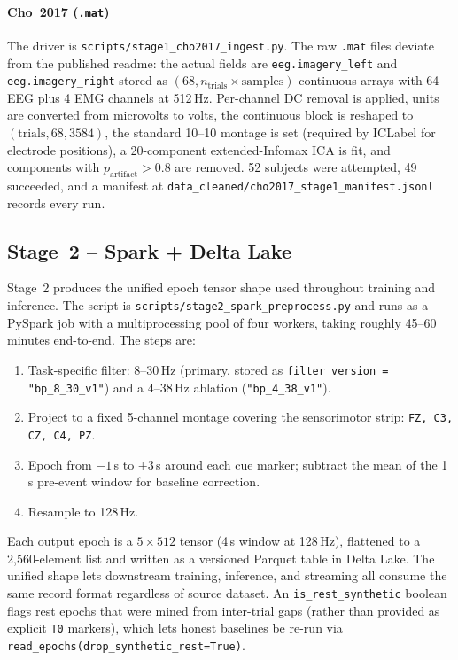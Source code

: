 \documentclass[conference]{IEEEtran}
\begin{document}
\paragraph{Cho~2017 (\texttt{.mat})} The driver is
\texttt{scripts/stage1\_cho2017\_ingest.py}. The raw \texttt{.mat} files
deviate from the published readme: the actual fields are
\texttt{eeg.imagery\_left} and \texttt{eeg.imagery\_right} stored as
$(68, n_\text{trials} \times \text{samples})$ continuous arrays with 64 EEG
plus 4 EMG channels at 512\,Hz. Per-channel DC removal is applied, units
are converted from microvolts to volts, the continuous block is reshaped to
$(\text{trials}, 68, 3584)$, the standard 10--10 montage is set (required
by ICLabel for electrode positions), a 20-component extended-Infomax ICA is
fit, and components with $p_\text{artifact} > 0.8$ are removed. 52 subjects
were attempted, 49 succeeded, and a manifest at
\texttt{data\_cleaned/cho2017\_stage1\_manifest.jsonl} records every
run.

\subsection{Stage~2 -- Spark + Delta Lake}

Stage~2 produces the unified epoch tensor shape used throughout training and
inference. The script is \texttt{scripts/stage2\_spark\_preprocess.py} and
runs as a PySpark job with a multiprocessing pool of four workers, taking
roughly 45--60 minutes end-to-end. The steps are:
\begin{enumerate}
\item Task-specific filter: 8--30\,Hz (primary, stored as
      \texttt{filter\_version = "bp\_8\_30\_v1"}) and a 4--38\,Hz ablation
      (\texttt{"bp\_4\_38\_v1"}).
\item Project to a fixed 5-channel montage covering the sensorimotor strip:
      \texttt{FZ, C3, CZ, C4, PZ}.
\item Epoch from $-1$\,s to $+3$\,s around each cue marker; subtract the
      mean of the 1\,s pre-event window for baseline correction.
\item Resample to 128\,Hz.
\end{enumerate}
Each output epoch is a $5 \times 512$ tensor (4\,s window at 128\,Hz),
flattened to a 2{,}560-element list and written as a versioned Parquet table
in Delta Lake. The unified shape lets downstream training, inference, and
streaming all consume the same record format regardless of source dataset.
An \texttt{is\_rest\_synthetic} boolean flags rest epochs that were mined
from inter-trial gaps (rather than provided as explicit \texttt{T0}
markers), which lets honest baselines be re-run via
\texttt{read\_epochs(drop\_synthetic\_rest=True)}.
\end{document}
